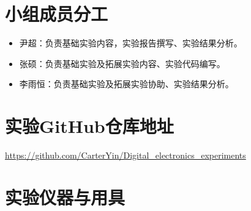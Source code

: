 \documentclass[UTF8]{article}
\theoremstyle{MyLineTheoremStyle} %
\theoremstyle{MyBlockTheoremStyle} %
\theoremstyle{MySubsubsectionStyle} %
\begin{document}
\section*{小组成员分工} %
\begin{itemize}
    \item 尹超：负责基础实验内容，实验报告撰写、实验结果分析。
    \item 张硕：负责基础实验及拓展实验内容、实验代码编写。
    \item 李雨恒：负责基础实验及拓展实验协助、实验结果分析。
\end{itemize}

\section*{实验GitHub仓库地址}
\begin{center}
    \url{https://github.com/CarterYin/Digital_electronics_experiments}
\end{center}
\setcounter{tocdepth}{2}  %
\noindent\tableofcontents\thispagestyle{fancy}   %


\newpage
{}








\section{实验仪器与用具}
\end{document}
